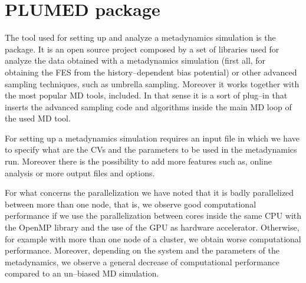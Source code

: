 \section{PLUMED package}
The tool used for setting up and analyze a metadynamics simulation is the \href{http://www.plumed.org}{\plumed} 
package. It is an open source project composed by a set of libraries used for analyze the data obtained with a 
metadynamics simulation (first all, for obtaining the \ac{FES} from the history--dependent bias potential) or 
other advanced sampling techniques, such as umbrella sampling. Moreover it works together with the most popular 
\ac{MD} tools, \gromacs included. In that sense it is a sort of plug--in that inserts the advanced sampling code 
and algorithms inside the main \ac{MD} loop of the used \ac{MD} tool.

For setting up a metadynamics simulation \plumed requires an input file in which we have to specify what are the 
\acp{CV} and the parameters to be used in the metadynamics run. Moreover there is the possibility to add more 
features such as, online analysis or more output files and options.

For what concerns the parallelization we have noted that it is badly parallelized between more than one node, 
that is, we observe good computational performance if we use the parallelization between cores inside the same 
CPU with the OpenMP library and the use of the GPU as hardware accelerator. Otherwise, for example with more than 
one node of a cluster, we obtain worse computational performance. Moreover, depending on the system and the 
parameters of the metadynamics, we observe a general decrease of computational performance compared to an 
un--biased \ac{MD} simulation.

%
%

